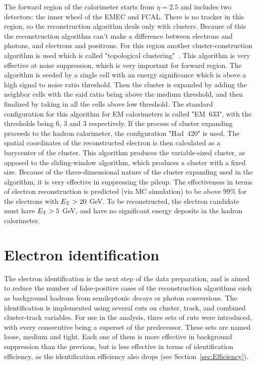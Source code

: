 The forward region of the calorimeter starts from $\eta = 2.5$ and includes two detectors: the inner wheel of the EMEC and FCAL. There is no tracker in this region, so the reconstruction algorithm deals only with clusters. Because of this the reconstruction algorithm can't make a difference between electrons and photons, and electrons and positrons. For this region another cluster-construction algorithm is used which is called "topological clustering"~\cite{lib:elec_reco_fwd}. This algorithm is very effective at noise suppression, which is very important for forward region. The algorithm is seeded by a single cell with an energy significance which is above a high signal to noise ratio threshold. Then the cluster is expanded by adding the neighbor cells with the said ratio being above the medium threshold, and then finalized by taking in all the cells above low threshold. The standard configuration for this algorithm for EM calorimeters is called "EM~633", with the thresholds being 6, 3 and 3 respectively. If the process of cluster expanding proceeds to the hadron calorimeter, the configuration "Had~420" is used. The spatial coordinates of the reconstructed electron is then calculated as a barycenter of the cluster. This algorithm produces the variable-sized cluster, as opposed to the sliding-window algorithm, which produces a cluster with a fixed size. Because of the three-dimensional nature of the cluster expanding used in the algorithm, it is very effective in suppressing the pileup. The effectiveness in terms of electron reconstruction is predicted (via MC simulation) to be above 99\% for the electrons with $E_{\mathrm{T}} > 20$ GeV. To be reconstructed, the electron candidate must have $E_{\mathrm{T}} > 5$ GeV, and have no significant energy deposits in the hadron calorimeter.

\section{Electron identification}
\label{sec:Rec_elecID}

The electron identification is the next step of the data preparation, and is aimed to reduce the number of false-positive cases of the reconstruction algorithms such as background hadrons from semileptonic decays or photon conversions. The identification is implemented using several cuts on cluster, track, and combined cluster-track variables. For use in the analysis, three sets of cuts were introduced, with every consecutive being a superset of the predecessor. These sets are named loose, medium and tight. Each one of them is more effective in background suppression than the previous, but is less effective in terms of identification efficiency, as the identification efficiency also drops (see Section~\ref{sec:Efficiency}).

